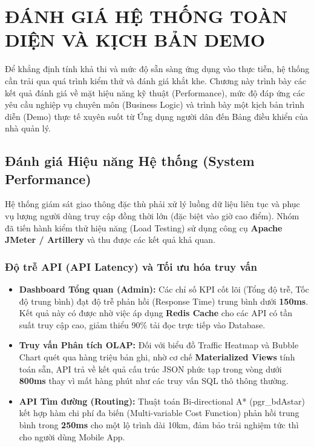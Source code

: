 \section{ĐÁNH GIÁ HỆ THỐNG TOÀN DIỆN VÀ KỊCH BẢN DEMO}

Để khẳng định tính khả thi và mức độ sẵn sàng ứng dụng vào thực tiễn, hệ thống cần trải qua quá trình kiểm thử và đánh giá khắt khe. Chương này trình bày các kết quả đánh giá về mặt hiệu năng kỹ thuật (Performance), mức độ đáp ứng các yêu cầu nghiệp vụ chuyên môn (Business Logic) và trình bày một kịch bản trình diễn (Demo) thực tế xuyên suốt từ Ứng dụng người dân đến Bảng điều khiển của nhà quản lý.

\subsection{Đánh giá Hiệu năng Hệ thống (System Performance)}

Hệ thống giám sát giao thông đặc thù phải xử lý luồng dữ liệu liên tục và phục vụ lượng người dùng truy cập đồng thời lớn (đặc biệt vào giờ cao điểm). Nhóm đã tiến hành kiểm thử hiệu năng (Load Testing) sử dụng công cụ \textbf{Apache JMeter / Artillery} và thu được các kết quả khả quan.

\subsubsection{Độ trễ API (API Latency) và Tối ưu hóa truy vấn}
\begin{itemize}
    \item \textbf{Dashboard Tổng quan (Admin):} Các chỉ số KPI cốt lõi (Tổng độ trễ, Tốc độ trung bình) đạt độ trễ phản hồi (Response Time) trung bình dưới \textbf{150ms}. Kết quả này có được nhờ việc áp dụng \textbf{Redis Cache} cho các API có tần suất truy cập cao, giảm thiểu 90\% tải đọc trực tiếp vào Database.
    \item \textbf{Truy vấn Phân tích OLAP:} Đối với biểu đồ Traffic Heatmap và Bubble Chart quét qua hàng triệu bản ghi, nhờ cơ chế \textbf{Materialized Views} tính toán sẵn, API trả về kết quả cấu trúc JSON phức tạp trong vòng dưới \textbf{800ms} thay vì mất hàng phút như các truy vấn SQL thô thông thường.
    \item \textbf{API Tìm đường (Routing):} Thuật toán Bi-directional A* (pgr\_bdAstar) kết hợp hàm chi phí đa biến (Multi-variable Cost Function) phản hồi trung bình trong \textbf{250ms} cho một lộ trình dài 10km, đảm bảo trải nghiệm tức thì cho người dùng Mobile App.
\end{itemize}

